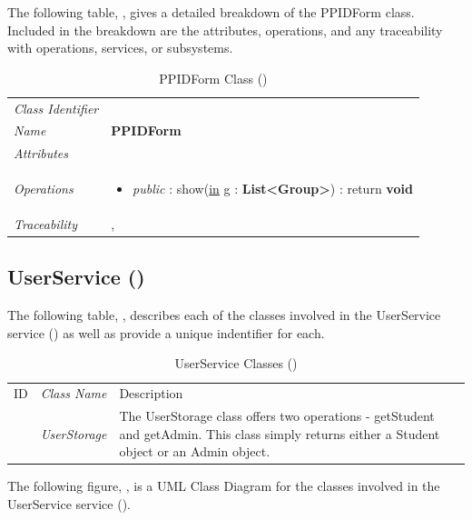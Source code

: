 \documentclass[12pt,letterpaper]{article}
\begin{document}
The following table, , gives a detailed breakdown of the PPIDForm class. Included in the breakdown are the attributes, operations, and any traceability with operations, services, or subsystems.

\begin{table}[H]
    \caption{PPIDForm Class ()} 
	\begin{tabu} to 
		\toprule
		Class Identifier &  \\
		Name & {\bf PPIDForm} \\
		Attributes & \\

		Operations &
		\begin{minipage}[t]{\linewidth}
			\begin{itemize}
			    \item {\it public} : show(\underline{in} g : {\bf List<Group>}) : return {\bf void}
	        \end{itemize}
	    \end{minipage} \\
	    	Traceability & , \\
		\toprule
	\end{tabu}
\end{table}

\subsection{UserService ()}

The following table, , describes each of the classes involved in the UserService service () as well as provide a unique indentifier for each.

\begin{table}[H]
	\caption{UserService Classes ()} 
	\begin{tabu} to 
	    \tableheader{}ID & Class Name & Description \\
         & UserStorage & The UserStorage class offers two operations - getStudent and getAdmin. This class simply returns either a Student object or an Admin object.\\
	\end{tabu}
\end{table}

The following figure, , is a UML Class Diagram for the classes involved in the UserService service ().
\end{document}
